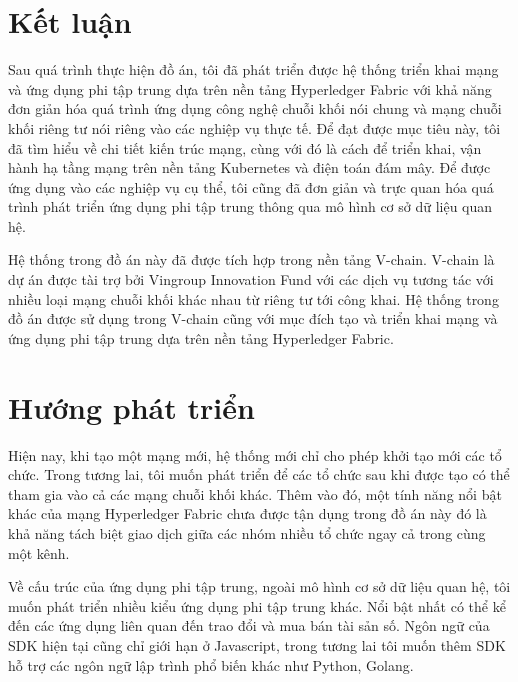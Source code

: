 \documentclass[../DoAn.tex]{subfiles}
\begin{document}
\section{Kết luận}

Sau quá trình thực hiện đồ án, tôi đã phát triển được hệ thống triển khai mạng và ứng dụng phi tập trung dựa trên nền tảng Hyperledger Fabric với khả năng đơn giản hóa quá trình ứng dụng công nghệ chuỗi khối nói chung và mạng chuỗi khối riêng tư nói riêng vào các nghiệp vụ thực tế. Để đạt được mục tiêu này, tôi đã tìm hiểu về chi tiết kiến trúc mạng, cùng với đó là cách để triển khai, vận hành hạ tầng mạng trên nền tảng Kubernetes và điện toán đám mây. Để được ứng dụng vào các nghiệp vụ cụ thể, tôi cũng đã đơn giản và trực quan hóa quá trình phát triển ứng dụng phi tập trung thông qua mô hình cơ sở dữ liệu quan hệ.

Hệ thống trong đồ án này đã được tích hợp trong nền tảng V-chain\cite{vchain}. V-chain là dự án được tài trợ bởi Vingroup Innovation Fund với các dịch vụ tương tác với nhiều loại mạng chuỗi khối khác nhau từ riêng tư tới công khai. Hệ thống trong đồ án được sử dụng trong V-chain cũng với mục đích tạo và triển khai mạng và ứng dụng phi tập trung dựa trên nền tảng Hyperledger Fabric.

\section{Hướng phát triển}

Hiện nay, khi tạo một mạng mới, hệ thống mới chỉ cho phép khởi tạo mới các tổ chức. Trong tương lai, tôi muốn phát triển để các tổ chức sau khi được tạo có thể tham gia vào cả các mạng chuỗi khối khác. Thêm vào đó, một tính năng nổi bật khác của mạng Hyperledger Fabric chưa được tận dụng trong đồ án này đó là khả năng tách biệt giao dịch giữa các nhóm nhiều tổ chức ngay cả trong cùng một kênh.

Về cấu trúc của ứng dụng phi tập trung, ngoài mô hình cơ sở dữ liệu quan hệ, tôi muốn phát triển nhiều kiểu ứng dụng phi tập trung khác. Nổi bật nhất có thể kể đến các ứng dụng liên quan đến trao đổi và mua bán tài sản số. Ngôn ngữ của SDK hiện tại cũng chỉ giới hạn ở Javascript, trong tương lai tôi muốn thêm SDK hỗ trợ các ngôn ngữ lập trình phổ biến khác như Python, Golang.
\end{document}
